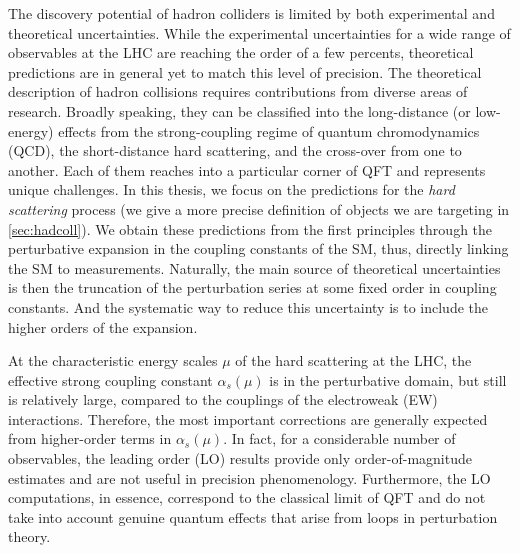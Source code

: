 The discovery potential of hadron colliders is limited by both experimental and theoretical uncertainties.
While the experimental uncertainties for a wide range of observables at the LHC are reaching the order of a few percents,
theoretical predictions are in general yet to match this level of precision.
The theoretical description of hadron collisions requires contributions from diverse areas of research.
Broadly speaking, they can be classified into the long-distance (or low-energy) effects from 
the strong-coupling regime of quantum chromodynamics (QCD), the short-distance hard scattering, and
the cross-over from one to another.
Each of them reaches into a particular corner of QFT and represents unique challenges.
In this thesis, we focus on the predictions for the \emph{hard scattering} process (we give a more precise definition of objects we are targeting in \cref{sec:hadcoll}).
We obtain these predictions from the first principles through the perturbative expansion in the coupling constants of the SM, thus, directly linking the SM to measurements.
Naturally, the main source of theoretical uncertainties is then the truncation
of the perturbation series at some fixed order in coupling constants.
And the systematic way to reduce this uncertainty is to include the higher orders of the expansion.

At the characteristic energy scales $\mu$ of the hard scattering at the LHC, the effective strong coupling constant $\alpha_s(\mu)$
is in the perturbative domain, but still is relatively large, compared to the couplings of the electroweak (EW) interactions.
Therefore, the most important corrections are generally expected from higher-order terms in $\alpha_s(\mu)$.
In fact, for a considerable number of observables,
the leading order (LO) results provide only order-of-magnitude estimates and are not useful in precision phenomenology.
Furthermore, the LO computations, in essence, correspond to the classical limit of QFT and do not take into account
genuine quantum effects that arise from loops in perturbation theory.

